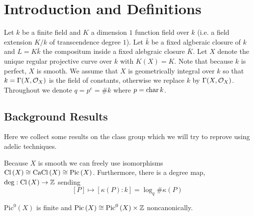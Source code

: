 \documentclass[12pt]{article}
\begin{document}
\section{Introduction and Definitions}

Let $k$ be a finite field and $K$ a dimension $1$ function field over $k$ (i.e. a field extension $K/k$ of transcendence degree $1$). Let $\bar{k}$ be a fixed algberaic closure of $k$ and $L = K \bar{k}$ the compositum inside a fixed alebgraic closure $\bar{K}$. Let $X$ denote the unique regular projective curve over $k$ with $K(X) = K$. Note that because $k$ is perfect, $X$ is smooth. We assume that $X$ is geometrically integral over $k$ so that $k = \Gamma(X, \mathcal{O}_{X})$ is the field of constants, otherwise we replace $k$ by $\Gamma(X, \mathcal{O}_{X})$. Throughout we denote $q = p^e = \# k$ where $p = \operatorname{\mathrm{char}}{k}$.

\subsection{Background Results}

Here we collect some results on the class group which we will try to reprove using adelic techniques.

\begin{rmk}
Because $X$ is smooth we can freely use isomorphisms $\mathrm{Cl} \left( X \right) \cong \mathrm{CaCl}\left( X \right) \cong \mathrm{Pic} \left( X \right)$. Furthermore, there is a degree map, $\deg : \mathrm{Cl} \left( X \right) \to \mathbb{Z}$ sending 
\[ [P] \mapsto [\kappa(P) : k] = \log_q{\# \kappa(P)} \]
\end{rmk}

\newcommand{\Picz}[1]{\mathrm{Pic}^0\left( #1 \right)}

\begin{lemma}
$\Picz{X}$ is finite and $\Pic{X} \cong \Picz{X} \times \Z$ noncanonically.
\end{lemma}
\end{document}
